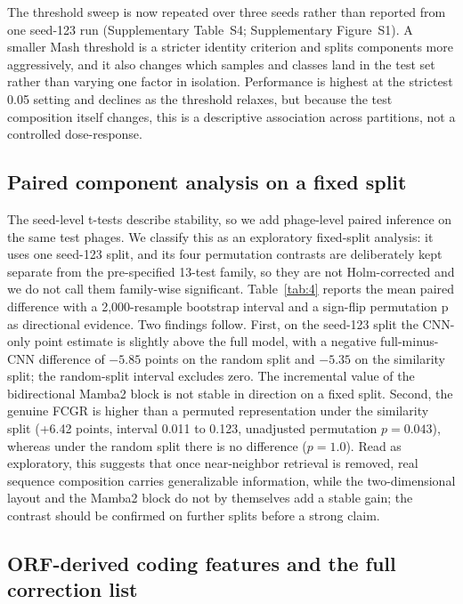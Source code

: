 \documentclass[utf8]{FrontiersinVancouver}
\begin{document}
The threshold sweep is now repeated over three seeds rather than reported from one seed-123 run (Supplementary Table~S4; Supplementary Figure~S1). A smaller Mash threshold is a stricter identity criterion and splits components more aggressively, and it also changes which samples and classes land in the test set rather than varying one factor in isolation. Performance is highest at the strictest 0.05 setting and declines as the threshold relaxes, but because the test composition itself changes, this is a descriptive association across partitions, not a controlled dose-response.

\subsection{Paired component analysis on a fixed split}

The seed-level t-tests describe stability, so we add phage-level paired inference on the same test phages. We classify this as an exploratory fixed-split analysis: it uses one seed-123 split, and its four permutation contrasts are deliberately kept separate from the pre-specified 13-test family, so they are not Holm-corrected and we do not call them family-wise significant. Table~\ref{tab:4} reports the mean paired difference with a 2,000-resample bootstrap interval and a sign-flip permutation p as directional evidence. Two findings follow. First, on the seed-123 split the CNN-only point estimate is slightly above the full model, with a negative full-minus-CNN difference of $-5.85$ points on the random split and $-5.35$ on the similarity split; the random-split interval excludes zero. The incremental value of the bidirectional Mamba2 block is not stable in direction on a fixed split. Second, the genuine FCGR is higher than a permuted representation under the similarity split (+6.42 points, interval 0.011 to 0.123, unadjusted permutation $p=0.043$), whereas under the random split there is no difference ($p=1.0$). Read as exploratory, this suggests that once near-neighbor retrieval is removed, real sequence composition carries generalizable information, while the two-dimensional layout and the Mamba2 block do not by themselves add a stable gain; the contrast should be confirmed on further splits before a strong claim.

\subsection{ORF-derived coding features and the full correction list}
\end{document}
